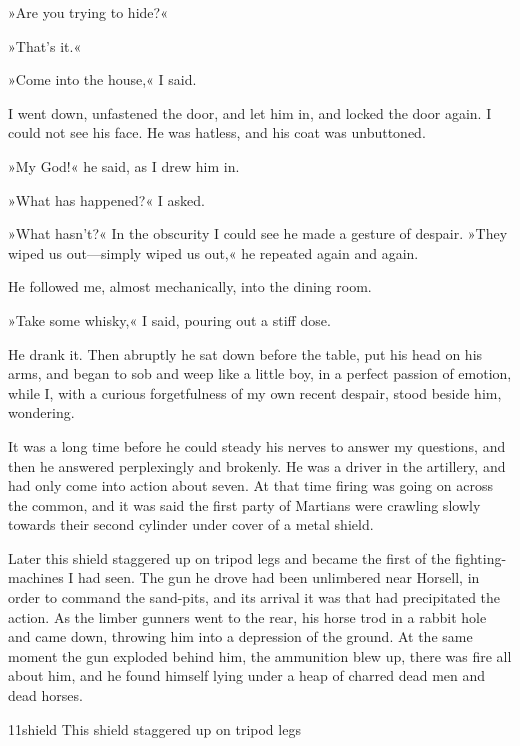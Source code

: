 »Are you trying to hide?«

»That's it.«

»Come into the house,« I said.

I went down, unfastened the door, and let him in, and locked the door again. I could not see his face. He was hatless, and his coat was unbuttoned.

»My God!« he said, as I drew him in.

»What has happened?« I asked.

»What hasn't?« In the obscurity I could see he made a gesture of despair. »They wiped us out—simply wiped us out,« he repeated again and again.

He followed me, almost mechanically, into the dining room.

»Take some whisky,« I said, pouring out a stiff dose.

He drank it. Then abruptly he sat down before the table, put his head on his arms, and began to sob and weep like a little boy, in a perfect passion of emotion, while I, with a curious forgetfulness of my own recent despair, stood beside him, wondering.

It was a long time before he could steady his nerves to answer my questions, and then he answered perplexingly and brokenly. He was a driver in the artillery, and had only come into action about seven. At that time firing was going on across the common, and it was said the first party of Martians were crawling slowly towards their second cylinder under cover of a metal shield.

Later this shield staggered up on tripod legs and became the first of the fighting-machines I had seen. The gun he drove had been unlimbered near Horsell, in order to command the sand-pits, and its arrival it was that had precipitated the action. As the limber gunners went to the rear, his horse trod in a rabbit hole and came down, throwing him into a depression of the ground. At the same moment the gun exploded behind him, the ammunition blew up, there was fire all about him, and he found himself lying under a heap of charred dead men and dead horses.


\begin{bwbigpic}
	[1.2] 
	{11shield} 
	{This shield staggered up on tripod legs} 
\end{bwbigpic}

